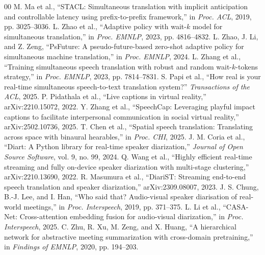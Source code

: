 \documentclass[conference]{IEEEtran}
\begin{document}
\begin{thebibliography}{00}
 M. Ma et al., ``STACL: Simultaneous translation with implicit anticipation and controllable latency using prefix-to-prefix framework,'' in \textit{Proc. ACL}, 2019, pp. 3025--3036.
 L. Zhao et al., ``Adaptive policy with wait-$k$ model for simultaneous translation,'' in \textit{Proc. EMNLP}, 2023, pp. 4816--4832.
 L. Zhao, J. Li, and Z. Zeng, ``PsFuture: A pseudo-future-based zero-shot adaptive policy for simultaneous machine translation,'' in \textit{Proc. EMNLP}, 2024.
 L. Zhang et al., ``Training simultaneous speech translation with robust and random wait-$k$-tokens strategy,'' in \textit{Proc. EMNLP}, 2023, pp. 7814--7831.
 S. Papi et al., ``How real is your real-time simultaneous speech-to-text translation system?'' \textit{Transactions of the ACL}, 2025.
 P. Pidathala et al., ``Live captions in virtual reality,'' arXiv:2210.15072, 2022.
 Y. Zhang et al., ``SpeechCap: Leveraging playful impact captions to facilitate interpersonal communication in social virtual reality,'' arXiv:2502.10736, 2025.
 T. Chen et al., ``Spatial speech translation: Translating across space with binaural hearables,'' in \textit{Proc. CHI}, 2025.
 J. M. Coria et al., ``Diart: A Python library for real-time speaker diarization,'' \textit{Journal of Open Source Software}, vol. 9, no. 99, 2024.
 Q. Wang et al., ``Highly efficient real-time streaming and fully on-device speaker diarization with multi-stage clustering,'' arXiv:2210.13690, 2022.
 R. Masumura et al., ``DiariST: Streaming end-to-end speech translation and speaker diarization,'' arXiv:2309.08007, 2023.
 J. S. Chung, B.-J. Lee, and I. Han, ``Who said that? Audio-visual speaker diarisation of real-world meetings,'' in \textit{Proc. Interspeech}, 2019, pp. 371--375.
 L. Li et al., ``CASA-Net: Cross-attention embedding fusion for audio-visual diarization,'' in \textit{Proc. Interspeech}, 2025.
 C. Zhu, R. Xu, M. Zeng, and X. Huang, ``A hierarchical network for abstractive meeting summarization with cross-domain pretraining,'' in \textit{Findings of EMNLP}, 2020, pp. 194--203.
\end{thebibliography}
\end{document}
